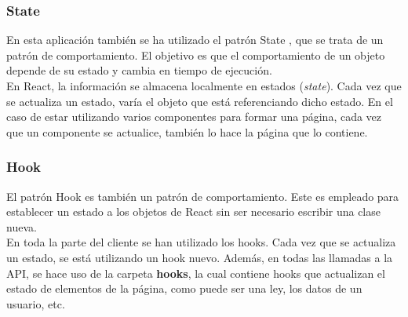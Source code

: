 \subsubsection{State}

En esta aplicación también se ha utilizado el patrón State \cite{state}, que se trata de un patrón de comportamiento. El objetivo es que el comportamiento de un objeto depende de su estado y cambia en tiempo de ejecución. 
\\

En React, la información se almacena localmente en estados ({\it state}). Cada vez que se actualiza un estado, varía el objeto que está referenciando dicho estado. En el caso de estar utilizando varios componentes para formar una página, cada vez que un componente se actualice, también lo hace la página que lo contiene.


\subsubsection{Hook}

El patrón Hook \cite{hooks} es también un patrón de comportamiento. Este es empleado para establecer un estado a los objetos de React sin ser necesario escribir una clase nueva.
\\

En toda la parte del cliente se han utilizado los hooks. Cada vez que se actualiza un estado, se está utilizando un hook nuevo. Además, en todas las llamadas a la API, se hace uso de la carpeta {\bf hooks}, la cual contiene hooks que actualizan el estado de elementos de la página, como puede ser una ley, los datos de un usuario, etc.